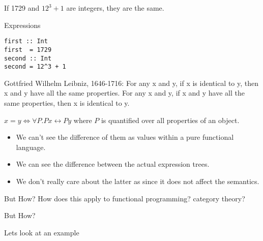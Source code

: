 \documentclass[tikz]{beamer}
\theoremstyle{definition}
\begin{document}
\begin{frame}[fragile]
If 1729 and $12^3+1$ are integers, they are the same.
    
\end{frame}

\begin{frame}[fragile]{Expressions}

\begin{verbatim}
first :: Int
first  = 1729
second :: Int
second = 12^3 + 1
\end{verbatim}
\end{frame}


\begin{frame}
\begin{block}{Gottfried Wilhelm Leibniz, 1646-1716:}
For any x and y, if x is identical to y, then x and y have all the same properties.
For any x and y, if x and y have all the same properties, then x is identical to y.
\end{block}
\end{frame}

\begin{frame}

$x = y \Leftrightarrow \forall P. P x \leftrightarrow P y$ where $P$ is quantified over all properties of an object.

\end{frame}


\begin{frame}

\begin{itemize}
\item We can't see the difference of them as values within a pure functional language. 
\item We can see the difference between the actual expression trees.
\item We don't really care about the latter as since it does not affect the semantics.
\end{itemize}

\end{frame}


\begin{frame}{But How?}
    How does this apply to functional programming? category theory? 
    
    
\end{frame}{}

\begin{frame}{But How?}
    
 Lets look at an example   
    
\end{frame}{}
\end{document}

